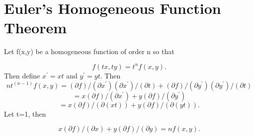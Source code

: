 \documentclass{article}
\begin{document}
\tableofcontents
\section{Euler's Homogeneous Function Theorem}
Let f(x,y) be a homogeneous function of order n so that

\[ f(tx,ty)=t^nf(x,y).\] 	
Then define $x^{\prime}=xt$ and $y^{\prime}=yt$. Then
\[ nt^(n-1)f(x,y)	=	(\partial f)/(\partial x^{\prime})(\partial x^{\prime})/(\partial t)+(\partial f)/(\partial y^{\prime})(\partial y^{\prime})/(\partial t)	\]
\[ 	=	x(\partial f)/(\partial x^{\prime})+y(\partial f)/(\partial y^{\prime})	\]
\[	=	x(\partial f)/(\partial(xt))+y(\partial f)/(\partial(yt)).\]
Let t=1, then

\[ x(\partial f)/(\partial x)+y(\partial f)/(\partial y)=nf(x,y). \]
\end{document}
